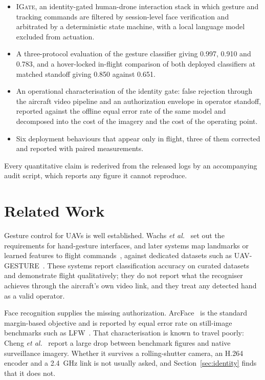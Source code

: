 \documentclass[conference]{IEEEtran}
\newcommand{\method}[1]{\textsc{#1}}
\begin{document}
\begin{itemize}
\item \method{IGate}, an identity-gated human-drone interaction stack in which
      gesture and tracking commands are filtered by session-level face
      verification and arbitrated by a deterministic state machine, with a local language model excluded from actuation.
\item A three-protocol evaluation of the gesture classifier giving 0.997, 0.910
      and 0.783, and a hover-locked in-flight comparison of both deployed
      classifiers at matched standoff giving 0.850 against 0.651.
\item An operational characterisation of the identity gate: false rejection
      through the aircraft video pipeline and an authorization envelope in
      operator standoff, reported against the offline equal error rate of the
      same model and decomposed into the cost of the imagery and the cost of the
      operating point.
\item Six deployment behaviours that appear only in flight, three of them
      corrected and reported with paired measurements.
\end{itemize}

Every quantitative claim is rederived from the released logs by an accompanying
audit script, which reports any figure it cannot reproduce.

\section{Related Work}
\label{sec:related}



Gesture control for UAVs is well established.
Wachs \emph{et al.}~\cite{wachs2011} set out the requirements for hand-gesture
interfaces, and later systems map landmarks or learned features to flight
commands~\cite{zhang2020,latif2022,hu2024hgic,taylor2025,abdalla2025edge},
against dedicated datasets such as \mbox{UAV-GESTURE}~\cite{perera2018uavgesture}.
These systems report classification accuracy on curated datasets and
demonstrate flight qualitatively; they do not report what the recogniser
achieves through the aircraft's own video link, and they treat any detected
hand as a valid operator.

Face recognition supplies the missing authorization.
ArcFace~\cite{deng2019} is the standard margin-based objective and is reported
by equal error rate on still-image benchmarks such as LFW~\cite{huang2008}.
That characterisation is known to travel poorly: Cheng \emph{et
al.}~\cite{cheng2018survface} report a large drop between benchmark figures and
native surveillance imagery.
Whether it survives a rolling-shutter camera, an H.264 encoder and a 2.4~GHz
link is not usually asked, and Section~\ref{sec:identity} finds that it does
not.
\end{document}
